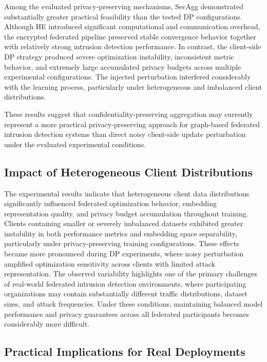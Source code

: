 \documentclass[conference]{IEEEtran}
\begin{document}
Among the evaluated privacy-preserving mechanisms, SecAgg demonstrated substantially greater practical feasibility than the tested DP configurations. Although HE introduced significant computational and communication overhead, the encrypted federated pipeline preserved stable convergence behavior together with relatively strong intrusion detection performance. In contrast, the client-side DP strategy produced severe optimization instability, inconsistent metric behavior, and extremely large accumulated privacy budgets across multiple experimental configurations. The injected perturbation interfered considerably with the learning process, particularly under heterogeneous and imbalanced client distributions.

These results suggest that confidentiality-preserving aggregation may currently represent a more practical privacy-preserving approach for graph-based federated intrusion detection systems than direct noisy client-side update perturbation under the evaluated experimental conditions.

\subsection{Impact of Heterogeneous Client Distributions}

The experimental results indicate that heterogeneous client data distributions significantly influenced federated optimization behavior, embedding representation quality, and privacy budget accumulation throughout training. Clients containing smaller or severely imbalanced datasets exhibited greater instability in both performance metrics and embedding space separability, particularly under privacy-preserving training configurations. These effects became more pronounced during DP experiments, where noisy perturbation amplified optimization sensitivity across clients with limited attack representation. The observed variability highlights one of the primary challenges of real-world federated intrusion detection environments, where participating organizations may contain substantially different traffic distributions, dataset sizes, and attack frequencies. Under these conditions, maintaining balanced model performance and privacy guarantees across all federated participants becomes considerably more difficult.

\subsection{Practical Implications for Real Deployments}
\end{document}
